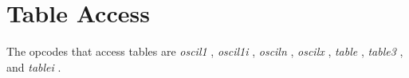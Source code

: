 \begin{comment}
\documentclass[10pt]{article}
\usepackage{fullpage, graphicx, url}
\setlength{\parskip}{1ex}
\setlength{\parindent}{0ex}
\title{Table Access}



\begin{tabular}{ccc}
The Alternative Csound Reference Manual & & \\
Previous &Signal Generators &Next

\end{tabular}

\end{comment}
\section{Table Access}


  The opcodes that access tables are \emph{oscil1}
, \emph{oscil1i}
, \emph{osciln}
, \emph{oscilx}
, \emph{table}
, \emph{table3}
, and \emph{tablei}
. 


\begin{comment}
\begin{tabular}{lcr}
Previous &Home &Next \\
Short-time Fourier Transform (STFT) Resynthesis &Up &Wave Terrain Synthesis

\end{tabular}



\end{comment}
